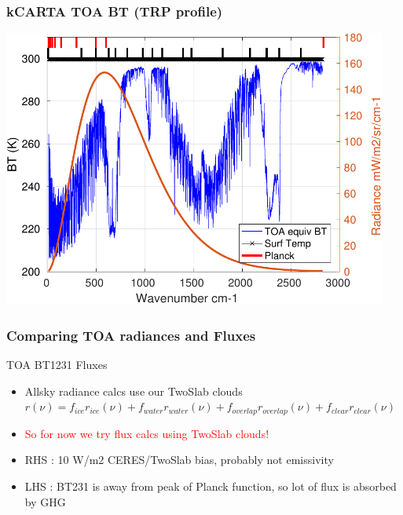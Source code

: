 \documentclass[10pt,t]{beamer}
\begin{document}
\begin{frame}
  \frametitle{kCARTA TOA BT (TRP profile)}

  \begin{center}
    \noindent\includegraphics[width=0.95\textwidth]{Figs/generic_planckTOABT.pdf}
  \end{center}
  
\end{frame}
\begin{frame}
  \frametitle{Comparing TOA radiances and Fluxes}

  \hspace{0.50in} TOA BT1231 \hspace{1.75in} Fluxes \\
  \begin{center}
  \end{center}

  \begin{itemize}
  \item Allsky radiance calcs use our TwoSlab clouds
    $r(\nu) = f_{ice} r_{ice}(\nu) + f_{water} r_{water}(\nu) +
    f_{overlap} r_{overlap}(\nu) + f_{clear} r_{clear}(\nu)$
  \item \textcolor{red}{So for now we try flux calcs using TwoSlab clouds!}
  \item RHS : 10 W/m2 CERES/TwoSlab bias, probably not emissivity
  \item LHS : BT231 is away from peak of Planck function, so lot of flux is absorbed by GHG
  \end{itemize}
\end{frame}
\end{document}
